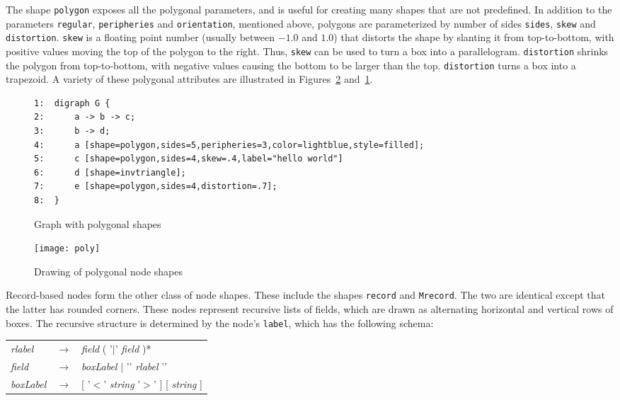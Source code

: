 \documentclass[11pt]{article}
\begin{document}
{The shape {\tt polygon} exposes all the polygonal parameters, and
is useful for creating many shapes that are not predefined.
In addition to the parameters {\tt regular}, {\tt peripheries} and
{\tt orientation}, mentioned above, polygons are parameterized by 
number of sides {\tt sides}, {\tt skew} and {\tt distortion}.
{\tt skew} is a floating point number (usually between $-1.0$ and $1.0$)
that distorts the shape by slanting it from top-to-bottom,
with positive values moving the top of the polygon to the right.
Thus, {\tt skew} can be used to turn a box into a parallelogram.
{\tt distortion} shrinks the polygon from top-to-bottom, with negative
values causing the bottom to be larger than the top. {\tt distortion}
turns a box into a trapezoid. A variety of these polygonal attributes
are illustrated in Figures~\ref{fig:polygons} and~\ref{fig:polylist}.

\begin{figure}[p]\footnotesize
\begin{verbatim}
1:  digraph G {
2:      a -> b -> c;
3:      b -> d;
4:      a [shape=polygon,sides=5,peripheries=3,color=lightblue,style=filled];
5:      c [shape=polygon,sides=4,skew=.4,label="hello world"]
6:      d [shape=invtriangle];
7:      e [shape=polygon,sides=4,distortion=.7];
8:  }
\end{verbatim}
\caption{Graph with polygonal shapes}
\label{fig:polylist}
\end{figure}
\begin{figure}[p]
	\centerline {
		\texttt{[image: poly]}
	}
    \caption{Drawing of polygonal node shapes}
    \label{fig:polygons}
    \vspace*{.5in} %
\end{figure}

Record-based nodes form the other class of node shapes. 
These include the
shapes {\tt record} and {\tt Mrecord}. The two are identical
except that the latter has rounded corners. These nodes represent
recursive lists of fields, which are drawn as alternating horizontal
and vertical rows of boxes. The recursive structure is determined by
the node's {\tt label}, which has the following schema: \\
\begin{table}[h]
\begin{tabular}{lll}
{\it rlabel}  & $\rightarrow$ & {\it field} ( '$|$' {\it field} )* \\
{\it field}  & $\rightarrow$ & {\it boxLabel} $|$ '{' {\it rlabel} '}' \\
{\it boxLabel}  & $\rightarrow$ & [ '$<$' {\it string} '$>$' ] [ {\it string} ] \\
\end{tabular}
\end{table}

}
\end{document}
